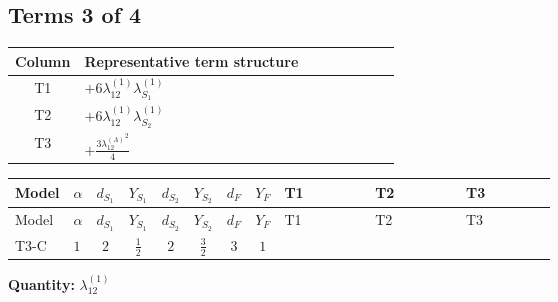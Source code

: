 \documentclass[8pt]{article}
\begin{document}
\begin{landscape}
\subsection*{Terms 3 of 4}
\begin{center}
\begin{tabular}{@{}c >{\raggedright\arraybackslash}p{0.82\linewidth}@{}}
\toprule
Column & Representative term structure \\
\midrule
T1 & \(\displaystyle +6 {\lambda_{12}^{(1)}} {\lambda_{S_1}^{(1)}}\) \\
\midrule
T2 & \(\displaystyle +6 {\lambda_{12}^{(1)}} {\lambda_{S_2}^{(1)}}\) \\
\midrule
T3 & \(\displaystyle +\frac{3 {\lambda_{12}^{(A)}}^2}{4}\) \\
\midrule
\bottomrule
\end{tabular}
\end{center}
\smallskip
\tiny
\begin{longtable}{@{}llcccccc >{\raggedright\arraybackslash}p{0.21\linewidth} >{\raggedright\arraybackslash}p{0.21\linewidth} >{\raggedright\arraybackslash}p{0.21\linewidth}@{}}
\toprule
Model & $\alpha$ & $d_{S_1}$ & $Y_{S_1}$ & $d_{S_2}$ & $Y_{S_2}$ & $d_F$ & $Y_F$ & T1 & T2 & T3 \\
\midrule
\endfirsthead
\toprule
Model & $\alpha$ & $d_{S_1}$ & $Y_{S_1}$ & $d_{S_2}$ & $Y_{S_2}$ & $d_F$ & $Y_F$ & T1 & T2 & T3 \\
\midrule
\endhead
T3-C & $1$ & $2$ & $\frac{1}{2}$ & $2$ & $\frac{3}{2}$ & $3$ & $1$ & \scriptsize\adjustbox{max width=\linewidth}{$\begin{gathered} +6 {\lambda_{12}^{(1)}} {\lambda_{S_1}^{(1)}}\end{gathered}$} & \scriptsize\adjustbox{max width=\linewidth}{$\begin{gathered} +6 {\lambda_{12}^{(1)}} {\lambda_{S_2}^{(1)}}\end{gathered}$} & \scriptsize\adjustbox{max width=\linewidth}{$\begin{gathered} +\frac{3 {\lambda_{12}^{(A)}}^2}{4}\end{gathered}$} \\
\midrule
\bottomrule
\end{longtable}
\clearpage
\noindent\textbf{Quantity: }$\lambda_{12}^{(1)}$\par\smallskip

\end{landscape}
\end{document}
